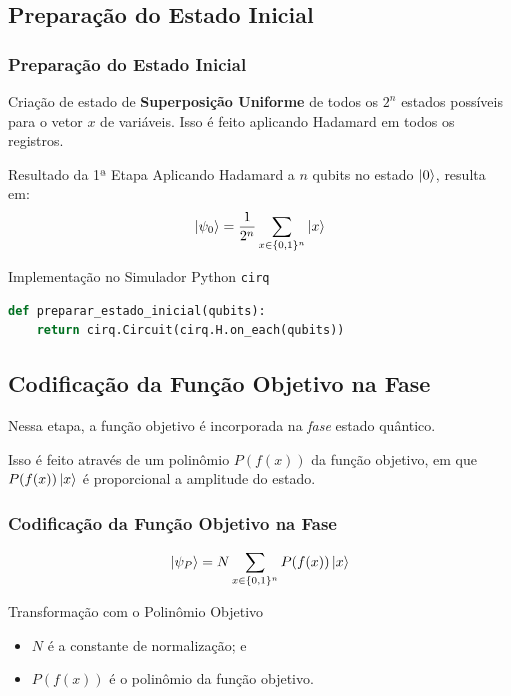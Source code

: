 \documentclass[aspectratio=169]{beamer}
\begin{document}
\subsection{Preparação do Estado Inicial}

\begin{frame}[fragile]
  \frametitle{Preparação do Estado Inicial}

  Criação de estado de \textbf{Superposição Uniforme} de todos os $2^n$ estados possíveis para o vetor $x$ de variáveis.
  Isso é feito aplicando Hadamard em todos os registros.

  \vfill

  \begin{block}{Resultado da 1ª Etapa}
  Aplicando Hadamard a $n$ qubits no estado $\ket{0}$, resulta em:
  \[
    \ket{\psi_0}=\frac{1}{2^n} \sum_{x\in\{0,1\}^n}\ket{x}
  \]
  \end{block}

  \begin{block}{Implementação no Simulador Python \lstinline|cirq|}
  \begin{lstlisting}[language=Python, frame=single, basicstyle=\tiny]
def preparar_estado_inicial(qubits):
    return cirq.Circuit(cirq.H.on_each(qubits))
  \end{lstlisting}
  \end{block}

\end{frame}

\subsection{Codificação da Função Objetivo na Fase}

\begin{frame}
  Nessa etapa, a função objetivo é incorporada na \textit{fase} estado quântico. 

  \vfill

  Isso é feito através de um polinômio $P(f(x))$ da função objetivo, em que $P(f(x))\ket{x}$ é proporcional a amplitude do estado.

  \frametitle{Codificação da Função Objetivo na Fase}
  \[
      \ket{\psi_P}=N \sum_{x\in\{0,1\}^n}P(f(x))\ket{x}
  \]
  \begin{block}{Transformação com o Polinômio Objetivo}
      \begin{itemize}
          \item $N$ é a constante de normalização; e
          \item $P(f(x))$ é o polinômio da função objetivo.
      \end{itemize}
  \end{block}
\end{frame}
\end{document}
